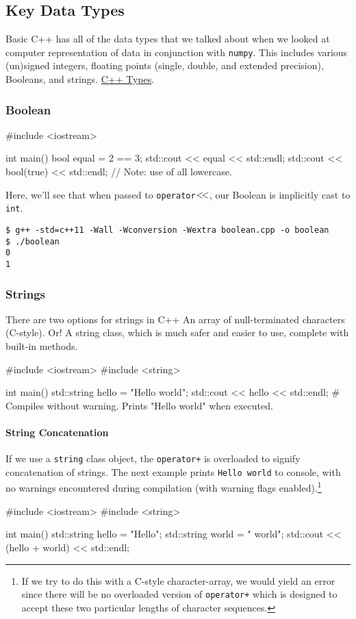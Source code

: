 \documentclass[12pt,letterpaper,twoside]{article}
\begin{document}
\subsection{Key Data Types}
Basic C++ has all of the data types that we talked about when we looked at
computer representation of data in conjunction with \texttt{numpy}. This includes
various (un)signed integers,
floating points (single, double,
and extended precision), Booleans, and
strings. \href{https://en.cppreference.com/w/cpp/language/type}{C++ Types}.

\subsubsection{Boolean}
\begin{cpp}
#include <iostream>

int main() {
  bool equal = 2 == 3;
  std::cout << equal << std::endl;
  std::cout << bool(true) << std::endl;  // Note: use of all lowercase.
}
\end{cpp}

Here, we'll see that when passed to
\texttt{operator$<\hspace{-2pt}<$}, our Boolean is implicitly
cast to \texttt{int}.
\begin{verbatim}
$ g++ -std=c++11 -Wall -Wconversion -Wextra boolean.cpp -o boolean
$ ./boolean
0
1
\end{verbatim}

\vspace{-3ex}
\subsubsection{Strings}
There are two options for strings in C++
An array of null-terminated characters (C-style). Or! 
A string class, which is much safer and easier to use, complete with
built-in methods.

\begin{cpp}
#include <iostream>
#include <string>

int main() {
  std::string hello = "Hello world";
  std::cout << hello << std::endl;    # Compiles without warning. Prints "Hello world" when executed.
}
\end{cpp}

\paragraph{String Concatenation}
If we use a \texttt{string} class object, the \texttt{operator+} is
overloaded to signify concatenation of strings. The next example
prints \texttt{Hello world} to console, with no warnings encountered
during compilation (with warning flags enabled).\footnote{If we try to do this with a C-style character-array, we would
yield an error since there will be no overloaded version of
\texttt{operator+} which is designed to accept these two particular
lengths of character sequences.
}
\begin{cpp}
#include <iostream>
#include <string>

int main() {
  std::string hello = "Hello";
  std::string world = " world";
  std::cout << (hello + world) << std::endl;
}
\end{cpp}
\end{document}
